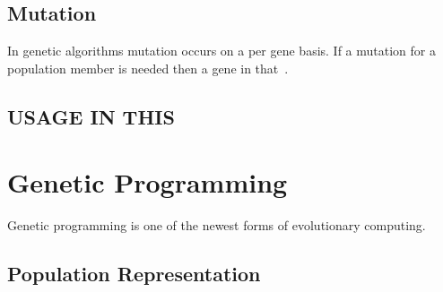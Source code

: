 \documentclass[12pt]{article}
\begin{document}
\subsection{Mutation}
In genetic algorithms mutation occurs on a per gene basis. If a mutation for a population member is needed then a gene in that~\cite{j1}. 

\subsection{USAGE IN THIS}

\section{Genetic Programming}
Genetic programming is one of the newest forms of evolutionary computing. 


\subsection{Population Representation}
\end{document}
